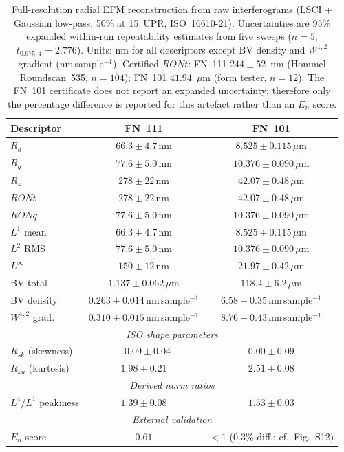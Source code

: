 \documentclass[review]{elsarticle}
\begin{document}
\begin{table}[htbp]
\centering
\footnotesize
\setlength{\tabcolsep}{4pt}
\caption{Full-resolution radial EFM reconstruction from raw interferograms (LSCI + Gaussian low-pass, 50\% at 15~UPR, ISO~16610-21). Uncertainties are 95\% expanded within-run repeatability estimates from five sweeps ($n=5$, $t_{0.975,4}=2.776$). Units: nm for all descriptors except BV density and $W^{1,2}$ gradient (nm\,sample$^{-1}$). Certified $RONt$: FN~111 $244 \pm 52$~nm (Hommel Roundscan~535, $n=104$); FN~101 $41.94$~$\mu$m (form tester, $n=12$). The FN~101 certificate does not report an expanded uncertainty; therefore only the percentage difference is reported for this artefact rather than an $E_n$ score.}
\label{tab:metric_phase_reconstruction}
\begin{tabular}{lcc}
\toprule
Descriptor & FN~111 & FN~101 \\
\midrule
$R_a$ & $66.3 \pm 4.7$\,nm & $8.525 \pm 0.115$\,$\mu$m \\
$R_q$ & $77.6 \pm 5.0$\,nm & $10.376 \pm 0.090$\,$\mu$m \\
$R_z$ & $278 \pm 22$\,nm & $42.07 \pm 0.48$\,$\mu$m \\
$RONt$ & $278 \pm 22$\,nm & $42.07 \pm 0.48$\,$\mu$m \\
$RONq$ & $77.6 \pm 5.0$\,nm & $10.376 \pm 0.090$\,$\mu$m \\
$L^1$ mean & $66.3 \pm 4.7$\,nm & $8.525 \pm 0.115$\,$\mu$m \\
$L^2$ RMS & $77.6 \pm 5.0$\,nm & $10.376 \pm 0.090$\,$\mu$m \\
$L^{\infty}$ & $150 \pm 12$\,nm & $21.97 \pm 0.42$\,$\mu$m \\
BV total & $1.137 \pm 0.062$\,$\mu$m & $118.4 \pm 6.2$\,$\mu$m \\
BV density & $0.263 \pm 0.014$\,nm\,sample$^{-1}$ & $6.58 \pm 0.35$\,nm\,sample$^{-1}$ \\
$W^{1,2}$ grad. & $0.310 \pm 0.015$\,nm\,sample$^{-1}$ & $8.76 \pm 0.43$\,nm\,sample$^{-1}$ \\
\midrule
\multicolumn{3}{c}{\textit{ISO shape parameters}} \\
$R_{sk}$ (skewness) & $-0.09 \pm 0.04$ & $0.00 \pm 0.09$ \\
$R_{ku}$ (kurtosis) & $1.98 \pm 0.21$ & $2.51 \pm 0.08$ \\
\midrule
\multicolumn{3}{c}{\textit{Derived norm ratios}} \\
$L^4/L^1$ peakiness & $1.39 \pm 0.08$ & $1.53 \pm 0.03$ \\
\midrule
\multicolumn{3}{c}{\textit{External validation}} \\
$E_n$ score & $0.61$ & $<1$ ($0.3\%$ diff.; cf.~Fig.~S12) \\
\bottomrule
\end{tabular}
\end{table}
\end{document}
